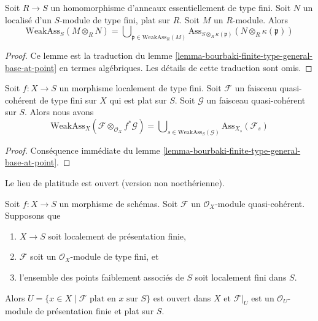 \begin{lemma}
\label{lemma-weak-bourbaki}
Soit $R \to S$ un homomorphisme d'anneaux essentiellement de type fini.
Soit $N$ un localisé d'un $S$-module de type fini, plat sur $R$.
Soit $M$ un $R$-module. Alors
$$
\text{WeakAss}_S(M \otimes_R N)
=
\bigcup\nolimits_{\mathfrak p \in \text{WeakAss}_R(M)}
\text{Ass}_{S \otimes_R \kappa(\mathfrak p)}(N \otimes_R \kappa(\mathfrak p))
$$
\end{lemma}

\begin{proof}
Ce lemme est la traduction
du lemme \ref{lemma-bourbaki-finite-type-general-base-at-point}
en termes algébriques. Les détails de cette traduction sont omis.
\end{proof}

\begin{lemma}
\label{lemma-bourbaki-finite-type-general-base}
Soit $f : X \to S$ un morphisme localement de type fini.
Soit $\mathcal{F}$ un faisceau quasi-cohérent de type fini sur $X$
qui est plat sur $S$. Soit $\mathcal{G}$ un faisceau quasi-cohérent sur $S$.
Alors nous avons
$$
\text{WeakAss}_X(\mathcal{F} \otimes_{\mathcal{O}_X} f^*\mathcal{G}) =
\bigcup\nolimits_{s \in \text{WeakAss}_S(\mathcal{G})}
\text{Ass}_{X_s}(\mathcal{F}_s)
$$
\end{lemma}

\begin{proof}
Conséquence immédiate du
lemme \ref{lemma-bourbaki-finite-type-general-base-at-point}.
\end{proof}

\begin{theorem}
\label{theorem-finite-type-flat}
\begin{slogan}
Le lieu de platitude est ouvert (version non noethérienne).
\end{slogan}
Soit $f : X \to S$ un morphisme de schémas.
Soit $\mathcal{F}$ un $\mathcal{O}_X$-module quasi-cohérent.
Supposons que
\begin{enumerate}
\item $X \to S$ soit localement de présentation finie,
\item $\mathcal{F}$ soit un $\mathcal{O}_X$-module de type fini, et
\item l'ensemble des points faiblement associés de $S$ soit localement fini dans $S$.
\end{enumerate}
Alors $U = \{x \in X \mid \mathcal{F}\text{ plat en }x\text{ sur }S\}$
est ouvert dans $X$ et $\mathcal{F}|_U$ est un $\mathcal{O}_U$-module
de présentation finie et plat sur $S$.
\end{theorem}

